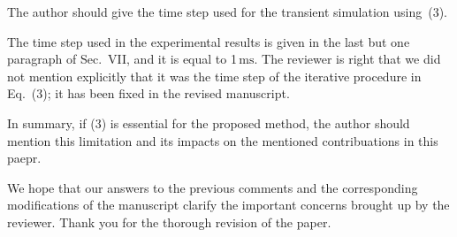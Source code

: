\begin{authors}
\begin{actions}
\end{actions}
\end{authors}

\begin{reviewer}
The author should give the time step used for the transient simulation using~(3).
\end{reviewer}
\begin{authors}
The time step used in the experimental results is given in the last but one paragraph of Sec.~VII, and it is equal to 1$\,\text{ms}$.
The reviewer is right that we did not mention explicitly that it was the time step of the iterative procedure in Eq.~(3); it has been fixed in the revised manuscript.

\begin{actions}
\end{actions}
\end{authors}

\begin{reviewer}
In summary, if (3) is essential for the proposed method, the author should mention this limitation and its impacts on the mentioned contribuations in this paepr.
\end{reviewer}
\begin{authors}
We hope that our answers to the previous comments and the corresponding modifications of the manuscript clarify the important concerns brought up by the reviewer.
Thank you for the thorough revision of the paper.
\end{authors}
